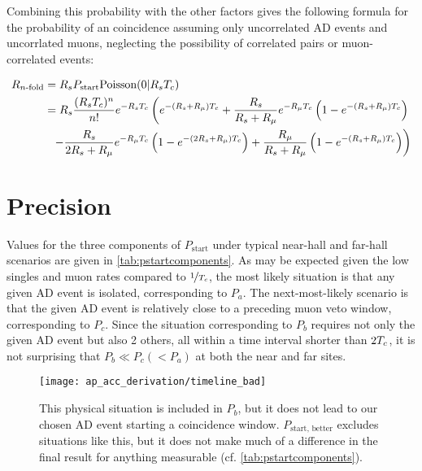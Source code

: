 Combining this probability with the other factors gives the following formula
for the probability of an  coincidence assuming only
uncorrelated AD events and uncorrlated muons,
neglecting the possibility of correlated pairs or muon-correlated events:

\begin{align} \label{eq:rnfold}
    \begin{split}
        R_{\text{\ensuremath{n}-fold}}
          &= R_s P_{\text{start}} \text{Poisson}(0\vert R_sT_c) \\
          &= R_s \frac{(R_sT_c)^n}{n!} e^{-R_sT_c}
          \left(
              e^{-(R_s + R_\mu)T_c} +
              \frac{R_s}{R_s+R_\mu} e^{-R_\mu T_c}
              \left(
                  1 - e^{-(R_s + R_\mu)T_c}
              \right)
          \right. \\
          &\ \ \left. - \frac{R_s}{2R_s + R_\mu} e^{-R_\mu T_c}
          \left(
              1 - e^{-(2R_s + R_\mu)T_c}
          \right) +
          \frac{R_\mu}{R_s + R_\mu}
          \left(
              1 - e^{-(R_s + R_\mu)T_c}
          \right)
      \right)
    \end{split}
\end{align}

\section{Precision}
\label{ap:singlesprecision}

Values for the three components of $P_{\text{start}}$
under typical near-hall and far-hall scenarios
are given in \cref{tab:pstartcomponents}.
As may be expected given the low singles and muon
rates compared to $\nicefrac{1}{T_c}$,
the most likely situation is that any given AD event
is isolated, corresponding to $P_a$.
The next-most-likely scenario is that the given AD event
is relatively close to a preceding muon veto window,
corresponding to $P_c$.
Since the situation corresponding to $P_b$ requires
not only the given AD event but also 2 others,
all within a time interval shorter than $2T_c$,
it is not surprising that $P_b\ll P_c (< P_a)$
at both the near and far sites.

\begin{figure}
    \texttt{[image: ap\_acc\_derivation/timeline\_bad]}
    \caption{
        This physical situation is included in $P_b$,
        but it does not lead to our chosen AD event
        starting a coincidence window.
        $P_{\text{start, better}}$ excludes situations like this,
        but it does not make much of a difference
        in the final result for anything measurable
        (cf. \cref{tab:pstartcomponents}).
    }
    \label{fig:ap_timeline_bad}
\end{figure}

